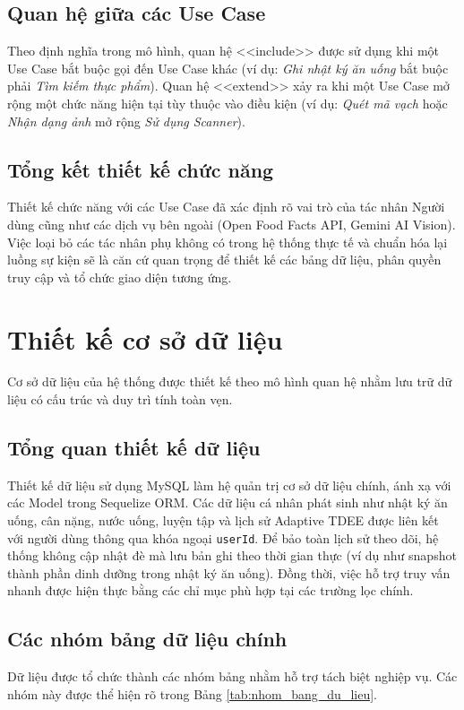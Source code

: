 \documentclass[12pt, a4paper]{report}
\begin{document}
\subsection{Quan hệ giữa các Use Case}
Theo định nghĩa trong mô hình, quan hệ <<include>> được sử dụng khi một Use Case bắt buộc gọi đến Use Case khác (ví dụ: \textit{Ghi nhật ký ăn uống} bắt buộc phải \textit{Tìm kiếm thực phẩm}). Quan hệ <<extend>> xảy ra khi một Use Case mở rộng một chức năng hiện tại tùy thuộc vào điều kiện (ví dụ: \textit{Quét mã vạch} hoặc \textit{Nhận dạng ảnh} mở rộng \textit{Sử dụng Scanner}).

\subsection{Tổng kết thiết kế chức năng}
Thiết kế chức năng với các Use Case đã xác định rõ vai trò của tác nhân Người dùng cũng như các dịch vụ bên ngoài (Open Food Facts API, Gemini AI Vision). Việc loại bỏ các tác nhân phụ không có trong hệ thống thực tế và chuẩn hóa lại luồng sự kiện sẽ là căn cứ quan trọng để thiết kế các bảng dữ liệu, phân quyền truy cập và tổ chức giao diện tương ứng.

\section{Thiết kế cơ sở dữ liệu}
Cơ sở dữ liệu của hệ thống được thiết kế theo mô hình quan hệ nhằm lưu trữ dữ liệu có cấu trúc và duy trì tính toàn vẹn.

\subsection{Tổng quan thiết kế dữ liệu}
Thiết kế dữ liệu sử dụng MySQL làm hệ quản trị cơ sở dữ liệu chính, ánh xạ với các Model trong Sequelize ORM. Các dữ liệu cá nhân phát sinh như nhật ký ăn uống, cân nặng, nước uống, luyện tập và lịch sử Adaptive TDEE được liên kết với người dùng thông qua khóa ngoại \texttt{userId}. Để bảo toàn lịch sử theo dõi, hệ thống không cập nhật đè mà lưu bản ghi theo thời gian thực (ví dụ như snapshot thành phần dinh dưỡng trong nhật ký ăn uống). Đồng thời, việc hỗ trợ truy vấn nhanh được hiện thực bằng các chỉ mục phù hợp tại các trường lọc chính.

\subsection{Các nhóm bảng dữ liệu chính}
Dữ liệu được tổ chức thành các nhóm bảng nhằm hỗ trợ tách biệt nghiệp vụ. Các nhóm này được thể hiện rõ trong Bảng \ref{tab:nhom_bang_du_lieu}.
\end{document}
